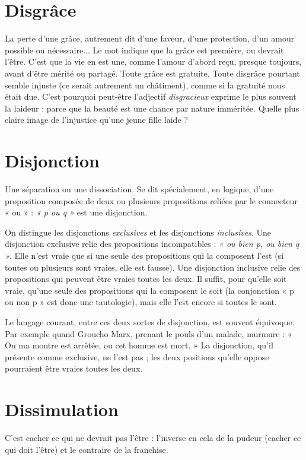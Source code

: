 \section{Disgrâce}
La perte d’une grâce, autrement dit d’une faveur, d’une protection,
d’un amour possible ou nécessaire... Le mot indique
que la grâce est première, ou devrait l’être. C’est que la vie en est une, comme
l'amour d’abord reçu, presque toujours, avant d’être mérité ou partagé. Toute
grâce est gratuite. Toute disgrâce pourtant semble injuste (ce serait autrement
un châtiment), comme si la gratuité nous était due. C’est pourquoi peut-être
l'adjectif {\it disgracieux} exprime le plus souvent la laideur : parce que la beauté est
une chance par nature imméritée. Quelle plus claire image de l’injustice qu’une
jeune fille laide ?

\section{Disjonction}
Une séparation ou une dissociation. Se dit spécialement, en
logique, d’une proposition composée de deux ou plusieurs
propositions reliées par le connecteur « ou » : {\it « p ou q »} est une disjonction.

On distingue les disjonctions {\it exclusives} et les disjonctions {\it inclusives}. Une
disjonction exclusive relie des propositions incompatibles : {\it « ou bien p, ou bien
q »}. Elle n’est vraie que si une seule des propositions qui la composent l’est (si
toutes ou plusieurs sont vraies, elle est fausse). Une disjonction inclusive relie
des propositions qui peuvent être vraies toutes les deux. Il suffit, pour qu’elle
soit vraie, qu’une seule des propositions qui la composent le soit (la conjonction
« p ou non p » est donc une tautologie), mais elle l’est encore si toutes le
sont.

Le langage courant, entre ces deux sortes de disjonction, est souvent équivoque.
Par exemple quand Groucho Marx, prenant le pouls d’un malade,
murmure : « Ou ma montre est arrêtée, ou cet homme est mort. » La disjonction,
qu'il présente comme exclusive, ne l’est pas ; les deux positions qu’elle
oppose pourraient être vraies toutes les deux.

\section{Dissimulation}
C’est cacher ce qui ne devrait pas l’être : l'inverse en
cela de la pudeur (cacher ce qui doit l’être) et le
contraire de la franchise.

